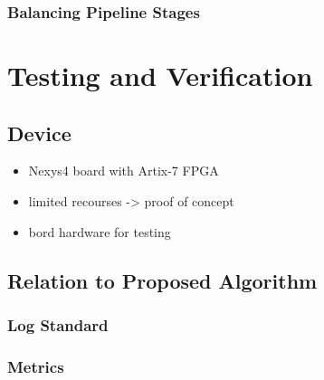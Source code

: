 \documentclass[mscthesis]{usiinfthesis}
\begin{document}
\subsection{Balancing Pipeline Stages}

\chapter{Testing and Verification}
\label{ch:test}

\section{Device}
\label{ch:test_dev}

\begin{itemize}
    \item Nexys4 board with Artix-7 FPGA
    \item limited recourses -> proof of concept
    \item bord hardware for testing
\end{itemize}

\section{Relation to Proposed Algorithm}
\label{ch:test_prop}

\subsection{Log Standard}

\subsection{Metrics}

\end{document}
